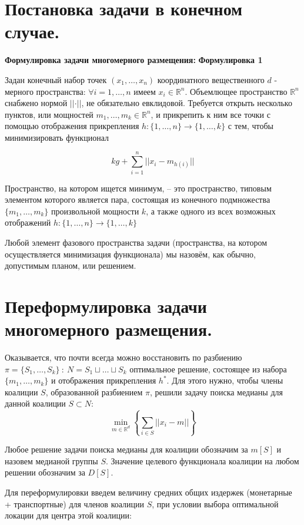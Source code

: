 \documentclass[a4paper,12pt]{article} %
\begin{document}
\section{Постановка задачи в конечном случае.}
\textbf{ Формулировка задачи многомерного размещения: }
\textbf{Формулировка 1}

\par
Задан конечный набор точек $(x_1, \dots, x_n)$ координатного вещественного $d$ - мерного пространства:  $\forall i = 1, \dots, n$ имеем $x_i \in \mathbb{R}^{n}$. Объемлющее пространство $\mathbb{R}^{n}$ снабжено нормой $\vert \vert \cdot \vert \vert$, не обязательно евклидовой. Требуется открыть несколько пунктов, или мощностей $m_1, \dots ,  m_k \in  \mathbb{R}^{n}$, и прикрепить к ним все точки с помощью отображения прикрепления $h : \{ 1, \dots, n \} \rightarrow \{ 1, \dots, k \} $ с тем, чтобы минимизировать функционал

\[ kg + \sum_{i = 1}^{n} \vert \vert x_i - m_{h(i)} \vert \vert \]

Пространство, на котором ищется минимум, -- это пространство, типовым элементом которого является пара, состоящая из конечного подмножества $\{ m_1, \dots, m_k \}$ произвольной мощности $k$, а также одного из всех возможных отображений $h : \{1, \dots, n \} \rightarrow \{ 1, \dots, k \}$ 

Любой элемент фазового пространства задачи (пространства, на котором
осуществляется минимизация функционала) мы назовём, как обычно,
допустимым планом, или решением. 

\section{Переформулировка задачи многомерного размещения.}
Оказывается, что почти всегда можно восстановить по разбиению $\pi = \{ S_1, \dots, S_k \} \ : \ N = S_1 \sqcup \dots \sqcup S_k $ оптимальное решение, состоящее из набора $\{ m_1, \dots, m_k \}$ и отображения прикрепления $h^*$. Для этого нужно, чтобы члены коалиции $S$, образованной разбиением $\pi$, решили задачу поиска медианы для данной коалиции $S \subset N :$ \\
\[ \min \limits_{m \in \mathbb{R}^d} \left\{ \sum_{i \in S} \vert \vert x_i - m \vert \vert \right\} \]

Любое решение задачи поиска медианы для коалиции обозначим за $m[S]$ и назовем медианой группы $S$. Значение целевого функционала коалиции на любом решении обозначим за $D[S]$.

Для переформулировки введем величину средних общих издержек (монетарные + транспортные) для членов коалиции $S$, при условии выбора оптимальной локации для центра этой коалиции:
\end{document}
